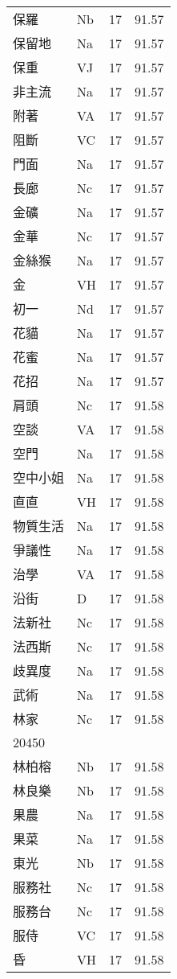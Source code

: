 \documentclass[twocolumn]{book}
\begin{document}
\begin{supertabular}{llrr}
保羅 & Nb & 17 &  91.57\\
保留地 & Na & 17 &  91.57\\
保重 & VJ & 17 &  91.57\\
非主流 & Na & 17 &  91.57\\
附著 & VA & 17 &  91.57\\
阻斷 & VC & 17 &  91.57\\
門面 & Na & 17 &  91.57\\
長廊 & Nc & 17 &  91.57\\
金礦 & Na & 17 &  91.57\\
金華 & Nc & 17 &  91.57\\
金絲猴 & Na & 17 &  91.57\\
金 & VH & 17 &  91.57\\
初一 & Nd & 17 &  91.57\\
花貓 & Na & 17 &  91.57\\
花蜜 & Na & 17 &  91.57\\
花招 & Na & 17 &  91.57\\
肩頭 & Nc & 17 &  91.58\\
空談 & VA & 17 &  91.58\\
空門 & Na & 17 &  91.58\\
空中小姐 & Na & 17 &  91.58\\
直直 & VH & 17 &  91.58\\
物質生活 & Na & 17 &  91.58\\
爭議性 & Na & 17 &  91.58\\
治學 & VA & 17 &  91.58\\
沿街 & D & 17 &  91.58\\
法新社 & Nc & 17 &  91.58\\
法西斯 & Nc & 17 &  91.58\\
歧異度 & Na & 17 &  91.58\\
武術 & Na & 17 &  91.58\\
林家 & Nc & 17 &  91.58\\
20450\\
林柏榕 & Nb & 17 &  91.58\\
林良樂 & Nb & 17 &  91.58\\
果農 & Na & 17 &  91.58\\
果菜 & Na & 17 &  91.58\\
東光 & Nb & 17 &  91.58\\
服務社 & Nc & 17 &  91.58\\
服務台 & Nc & 17 &  91.58\\
服侍 & VC & 17 &  91.58\\
昏 & VH & 17 &  91.58\\

\end{supertabular}
\end{document}
